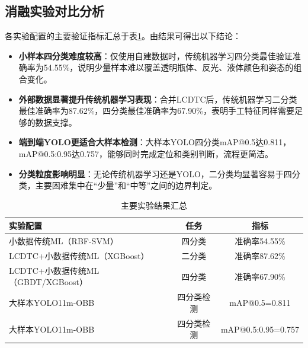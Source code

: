 \documentclass[withoutpreface,bwprint]{cumcmthesis}
\begin{document}
\FloatBarrier

\subsection{消融实验对比分析}
各实验配置的主要验证指标汇总于表\ref{tab:ablation}。由结果可得出以下结论：
\begin{itemize}
    \item \textbf{小样本四分类难度较高}：仅使用自建数据时，传统机器学习四分类最佳验证准确率为54.55\%，说明少量样本难以覆盖透明瓶体、反光、液体颜色和姿态的组合变化。
    \item \textbf{外部数据显著提升传统机器学习表现}：合并LCDTC后，传统机器学习二分类最佳准确率为87.62\%，四分类最佳准确率为67.90\%，表明手工特征同样需要足够的数据支撑。
    \item \textbf{端到端YOLO更适合大样本检测}：大样本YOLO四分类mAP@0.5达0.811，mAP@0.5:0.95达0.757，能够同时完成定位和类别判断，流程更简洁。
    \item \textbf{分类粒度影响明显}：无论传统机器学习还是YOLO，二分类均显著容易于四分类，主要困难集中在“少量”和“中等”之间的边界判定。
\end{itemize}

\begin{table}[htbp]
    \centering
    \caption{主要实验结果汇总}
    \label{tab:ablation}
    \small
    \begin{tabular}{lcc}
        \toprule
        实验配置 & 任务 & 指标 \\
        \midrule
        小数据传统ML（RBF-SVM） & 四分类 & 准确率54.55\% \\
        LCDTC+小数据传统ML（XGBoost） & 二分类 & 准确率87.62\% \\
        LCDTC+小数据传统ML（GBDT/XGBoost） & 四分类 & 准确率67.90\% \\
        大样本YOLO11m-OBB & 四分类检测 & mAP@0.5=0.811 \\
        大样本YOLO11m-OBB & 四分类检测 & mAP@0.5:0.95=0.757 \\
        \bottomrule
    \end{tabular}
\end{table}

\FloatBarrier
\end{document}

